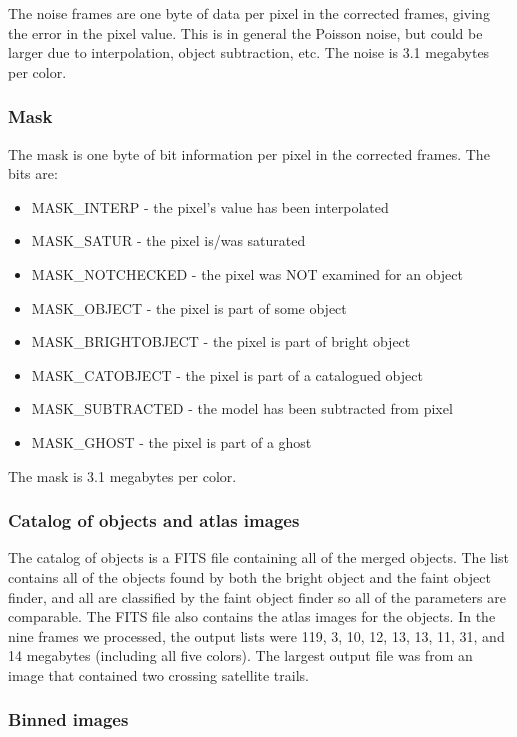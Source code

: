 	The noise frames are one byte of data per pixel in the corrected
frames, giving the error in the pixel value.  This is in general the
Poisson noise, but could be larger due to interpolation, object subtraction,
etc.  The noise is 3.1 megabytes per color.

\subsubsection{Mask}

	The mask is one byte of bit information per pixel in the corrected
frames.  The bits are:

\begin{itemize}
\item MASK\_INTERP - the pixel's value has been interpolated
\item MASK\_SATUR - the pixel is/was saturated
\item MASK\_NOTCHECKED - the pixel was NOT examined for an object
\item MASK\_OBJECT - the pixel is part of some object
\item MASK\_BRIGHTOBJECT - the pixel is part of bright object
\item MASK\_CATOBJECT - the pixel is part of a catalogued object
\item MASK\_SUBTRACTED - the model has been subtracted from pixel
\item MASK\_GHOST - the pixel is part of a ghost
\end {itemize}

The mask is 3.1 megabytes per color.

\subsubsection{Catalog of objects and atlas images}

The catalog of objects is a FITS file containing all of the merged objects.
The list contains all of the objects found by both the bright object and
the faint object finder, and all are classified by the faint object finder
so all of the parameters are comparable.  The FITS file also contains the
atlas images for the objects.  In the nine frames we processed, the
output lists were 119, 3, 10, 12, 13, 13, 11, 31, and 14 megabytes (including
all five colors).  The largest output file was from an image that contained
two crossing satellite trails.

\subsubsection{Binned images}

